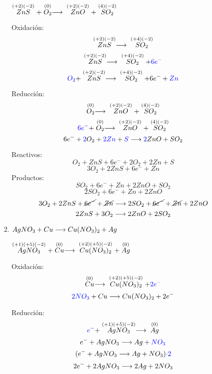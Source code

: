 \documentclass[../practica.root.tex]{subfiles}
\begin{document}
\begin{enumerate}
\begin{enumerate}
                    $\stackrel{(+2)(-2)}{ZnS} + \stackrel{(0)}{O_2} \longrightarrow{} \stackrel{(+2)(-2)}{ZnO} + \stackrel{(4)(-2)}{SO_2}$

                    \begin{multicols}{2}
                        Oxidación:
                        \[ \stackrel{(+2)(-2)}{ZnS} \longrightarrow{} \stackrel{(+4)(-2)}{SO_2} \]
                        \[ \stackrel{(+2)(-2)}{ZnS} \longrightarrow{} \stackrel{(+4)(-2)}{SO_2} + \textcolor{blue}{6e^-} \]
                        \[ \textcolor{blue}{O_2} + \stackrel{(+2)(-2)}{ZnS} \longrightarrow{} \stackrel{(+4)(-2)}{SO_2} + 6 e^- + \textcolor{blue}{Zn} \]

                        \columnbreak

                        Reducción:
                        \[ \stackrel{(0)}{O_2} \longrightarrow{} \stackrel{(+2)(-2)}{ZnO} + \stackrel{(4)(-2)}{SO_2} \]
                        \[ \textcolor{blue}{6e^-} + \stackrel{(0)}{O_2} \longrightarrow{} \stackrel{(+2)(-2)}{ZnO} + \stackrel{(4)(-2)}{SO_2} \]
                        \[ 6 e^- + \textcolor{blue}{2} O_2 + \textcolor{blue}{2Zn} + \textcolor{blue}{S} \longrightarrow{} \textcolor{blue}{2} ZnO + SO_2 \]
                    \end{multicols}


                    Reactivos:
                    \[ O_2 + ZnS + 6 e^- + 2 O_2 + 2Zn + S \]
                    \[ 3 O_2 + 2 ZnS + 6 e^- + Zn \]
                    Productos:
                    \[ SO_2 + 6 e^- + Zn + 2 ZnO + SO_2 \]
                    \[ 2 SO_2 + 6 e^- + Zn + 2 ZnO \]
                    \[ 3 O_2 + 2 ZnS + \cancel{6 e^-} + \cancel{Zn} \longrightarrow{} 2 SO_2 + \cancel{6 e^-} + \cancel{Zn} + 2 ZnO \]
                    \[ 2 ZnS + 3 O_2 \longrightarrow{} 2 ZnO + 2 SO_2 \]

              \item $AgNO_3 + Cu \longrightarrow{} Cu(NO_3)_2 + Ag$

                    $\stackrel{(+1)(+5)(-2)}{AgNO_3} + \stackrel{(0)}{Cu} \longrightarrow{} \stackrel{(+2)(+5)(-2)}{Cu(NO_3)_2} + \stackrel{(0)}{Ag}$

                    \begin{multicols}{2}
                        Oxidación:
                        \[ \stackrel{(0)}{Cu} \longrightarrow{} \stackrel{(+2)(+5)(-2)}{Cu(NO_3)_2} + \textcolor{blue}{2e^-} \]
                        \[ \textcolor{blue}{2NO_3} + Cu \longrightarrow{} Cu(NO_3)_2 + 2 e^- \]

                        \columnbreak

                        Reducción:
                        \[ \textcolor{blue}{e^-} + \stackrel{(+1)(+5)(-2)}{AgNO_3} \longrightarrow{} \stackrel{(0)}{Ag} \]
                        \[ e^- + AgNO_3 \longrightarrow{} Ag + \textcolor{blue}{NO_3} \]
                        \[ (e^- + AgNO_3 \longrightarrow{} Ag + NO_3)\textcolor{blue}{\cdot 2} \]
                        \[ 2 e^- + 2 AgNO_3 \longrightarrow{} 2 Ag + 2 NO_3 \]
                    \end{multicols}


\end{enumerate}
\end{enumerate}
\end{document}
